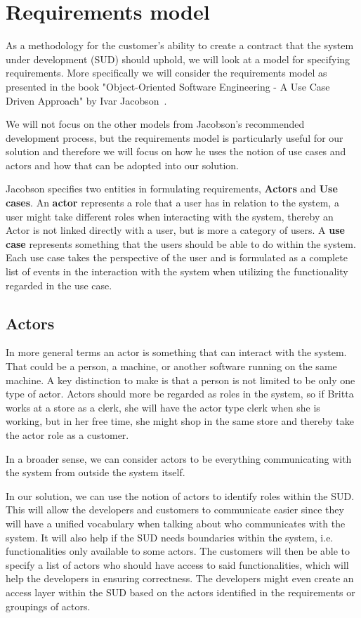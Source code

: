 \section{Requirements model}

As a methodology for the customer's ability to create a contract that the system under development (SUD) should uphold, we will look at a model for specifying requirements.
More specifically we will consider the requirements model as presented in the book "Object-Oriented Software Engineering - A Use Case Driven Approach" by Ivar Jacobson~\cite{Jacobson1992}.

We will not focus on the other models from Jacobson's recommended development process, but the requirements model is particularly useful for our solution and therefore we will focus on how he uses the notion of use cases and actors and how that can be adopted into our solution.

Jacobson specifies two entities in formulating requirements, \textbf{Actors} and \textbf{Use cases}.
An \textbf{actor} represents a role that a user has in relation to the system, a user might take different roles when interacting with the system, thereby an Actor is not linked directly with a user, but is more a category of users.
A \textbf{use case} represents something that the users should be able to do within the system. Each use case takes the perspective of the user and is formulated as a complete list of events in the interaction with the system when utilizing the functionality regarded in the use case.

\subsection{Actors}
In more general terms an actor is something that can interact with the system. That could be a person, a machine, or another software running on the same machine. 
A key distinction to make is that a person is not limited to be only one type of actor.
Actors should more be regarded as roles in the system, so if Britta works at a store as a clerk, she will have the actor type clerk when she is working, but in her free time, she might shop in the same store and thereby take the actor role as a customer. 

In a broader sense, we can consider actors to be everything communicating with the system from outside the system itself.

In our solution, we can use the notion of actors to identify roles within the SUD.
This will allow the developers and customers to communicate easier since they will have a unified vocabulary when talking about who communicates with the system. 
It will also help if the SUD needs boundaries within the system, i.e. functionalities only available to some actors.
The customers will then be able to specify a list of actors who should have access to said functionalities, which will help the developers in ensuring correctness.
The developers might even create an access layer within the SUD based on the actors identified in the requirements or groupings of actors.

